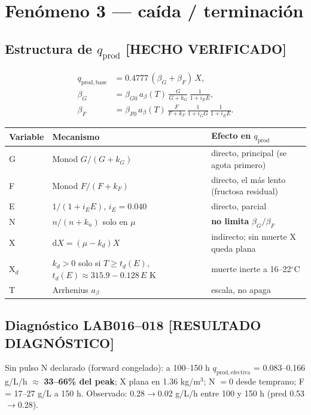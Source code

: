 \documentclass[11pt,a4paper]{article}
\newcommand{\hecho}{\textcolor{hecho}{\textbf{[HECHO VERIFICADO]}}}
\newcommand{\diag}{\textcolor{diagc}{\textbf{[RESULTADO DIAGN\'OSTICO]}}}
\begin{document}
\section{Fen\'omeno 3 --- ca\'ida / terminaci\'on}

\subsection{Estructura de $q_{\mathrm{prod}}$ \hecho}
\begin{align}
q_{\mathrm{prod,base}} &= 0.4777\,(\beta_G + \beta_F)\,X,\\
\beta_G &= \beta_{G0}\,a_\beta(T)\,\frac{G}{G+k_G}\,\frac{1}{1+i_E E},\\
\beta_F &= \beta_{F0}\,a_\beta(T)\,\frac{F}{F+k_F}\,\frac{1}{1+i_G G}\,\frac{1}{1+i_E E}.
\end{align}

\begin{table}[h]\centering\small
\begin{tabularx}{\textwidth}{P{1.1cm}L P{4.6cm}}
\toprule
Variable & Mecanismo & Efecto en $q_{\mathrm{prod}}$ \\
\midrule
G & Monod $G/(G+k_G)$ & directo, principal (se agota primero) \\
F & Monod $F/(F+k_F)$ & directo, el m\'as lento (fructosa residual) \\
E & $1/(1+i_E E)$, $i_E=0.040$ & directo, parcial \\
N & $n/(n+k_n)$ solo en $\mu$ & \textbf{no limita} $\beta_G/\beta_F$ \\
X & $\mathrm{d}X=(\mu-k_d)X$ & indirecto; sin muerte X queda plana \\
X$_d$ & $k_d>0$ solo si $T\ge t_d(E)$, $t_d(E)\approx 315.9-0.128\,E$ K & muerte inerte a 16--22$^\circ$C \\
T & Arrhenius $a_\beta$ & escala, no apaga \\
\bottomrule
\end{tabularx}
\end{table}

\subsection{Diagn\'ostico LAB016--018 \diag}
Sin pulso N declarado (forward congelado): a 100--150 h $q_{\mathrm{prod,efectiva}}$ = 0.083--0.166 g/L/h $\approx$ \textbf{33--66\% del peak}; X plana en 1.36 kg/m$^3$; N $=0$ desde temprano; F = 17--27 g/L a 150 h. Observado: 0.28$\to$0.02 g/L/h entre 100 y 150 h (pred 0.53$\to$0.28).
\end{document}
